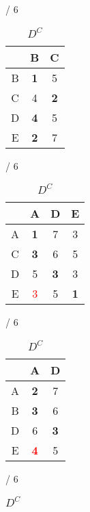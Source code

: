 \documentclass[a4paper, 11 pt, article, accentcolor=tud7b]{tudreport}
\begin{document}
			\begin{table}[h]
	  \begin{subtable}[b]{\textwidth / 6}
	    \begin{tabular}{| c | c | c |}
	      \hline
	        & B                   & C          \\ \hline
	      B & \textbf{1}          & 5          \\ \hline
	      C & 4                   & \textbf{2} \\ \hline
	      D & \textbf{4}          & 5          \\ \hline
	      E & \textbf{2}          & 7          \\ \hline
	    \end{tabular}
	    \caption{$D^{A}$}
	  \end{subtable}
	  \hfill
	  \begin{subtable}[b]{\textwidth / 6}
	    \begin{tabular}{| c | c | c | c |}
	    \hline
	      & A                   & D          & E                  \\ \hline
	    A & \textbf{1}          & 7          & 3                  \\ \hline
	    C & \textbf{3}          & 6          & 5                  \\ \hline
	    D & 5                   & \textbf{3} & 3                  \\ \hline
	    E & \textcolor{red}{3}  & 5          & \textbf{1}         \\ \hline
	    \end{tabular}
	    \caption{$D^{B}$}
	  \end{subtable}
	  \hfill
	  \begin{subtable}[b]{\textwidth / 6}
	    \begin{tabular}{| c | c | c |}
	    \hline
	      & A                   & D          \\ \hline
	    A & \textbf{2}          & 7          \\ \hline
	    B & \textbf{3}          & 6          \\ \hline
	    D & 6                   & \textbf{3} \\ \hline
	    E & \textbf{\textcolor{red}{4}} & 5  \\ \hline
	    \end{tabular}
	    \caption{$D^{C}$}
	  \end{subtable}
    \hfill
	  \begin{subtable}[b]{\textwidth / 6}
	    \begin{tabular}{| c | c | c | c |}

\end{tabular}
\end{subtable}
\end{table}
\end{document}
